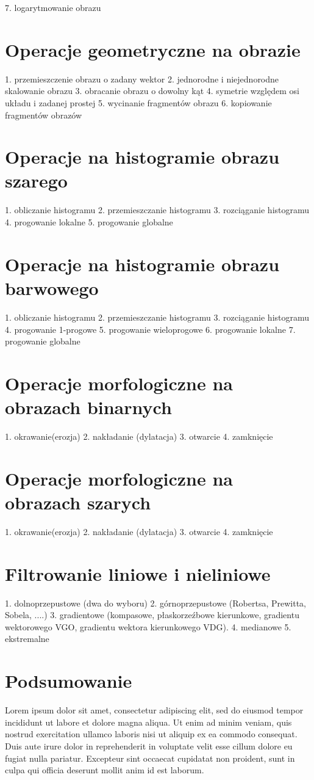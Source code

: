 \documentclass[final,a4paper,openany,12pt]{mwbk}
\begin{document}
7. logarytmowanie obrazu

\chapter{Operacje geometryczne na obrazie}
1. przemieszczenie obrazu o zadany wektor
2. jednorodne i niejednorodne skalowanie obrazu
3. obracanie obrazu o dowolny kąt
4. symetrie względem osi układu i zadanej prostej
5. wycinanie fragmentów obrazu
6. kopiowanie fragmentów obrazów

\chapter{Operacje na histogramie obrazu szarego}
1. obliczanie histogramu
2. przemieszczanie histogramu
3. rozciąganie histogramu
4. progowanie lokalne
5. progowanie globalne

\chapter{Operacje na histogramie obrazu barwowego}
1. obliczanie histogramu
2. przemieszczanie histogramu
3. rozciąganie histogramu
4. progowanie 1-progowe
5. progowanie wieloprogowe
6. progowanie lokalne
7. progowanie globalne

\chapter{Operacje morfologiczne na obrazach binarnych}
1. okrawanie(erozja)
2. nakładanie (dylatacja)
3. otwarcie
4. zamknięcie

\chapter {Operacje morfologiczne na obrazach szarych}
1. okrawanie(erozja)
2. nakładanie (dylatacja)
3. otwarcie
4. zamknięcie

\chapter {Filtrowanie liniowe i nieliniowe}
1. dolnoprzepustowe (dwa do wyboru)
2. górnoprzepustowe (Robertsa, Prewitta, Sobela, ....)
3. gradientowe (kompasowe, płaskorzeźbowe kierunkowe, gradientu wektorowego VGO, gradientu
wektora kierunkowego VDG).
4. medianowe
5. ekstremalne

\chapter{Podsumowanie}

Lorem ipsum dolor sit amet, consectetur adipiscing elit, sed do eiusmod tempor incididunt ut labore et dolore magna aliqua. Ut enim ad minim veniam, quis nostrud exercitation ullamco laboris nisi ut aliquip ex ea commodo consequat. Duis aute irure dolor in reprehenderit in voluptate velit esse cillum dolore eu fugiat nulla pariatur. Excepteur sint occaecat cupidatat non proident, sunt in culpa qui officia deserunt mollit anim id est laborum.



\end{document}
